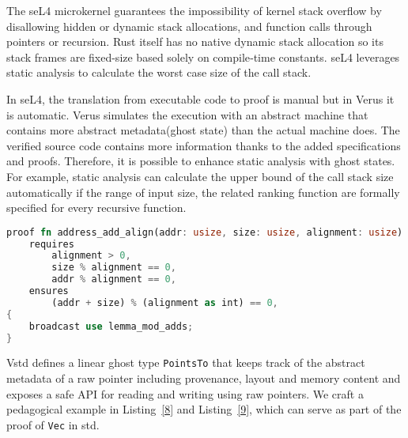 \documentclass[conference]{IEEEtran}
\begin{document}
The seL4\cite{sel4} microkernel guarantees the impossibility of kernel stack overflow by disallowing hidden or dynamic stack allocations, and function calls through pointers or recursion. Rust itself has no native dynamic stack allocation so its stack frames are fixed-size based solely on compile‐time constants. seL4 leverages static analysis to calculate the worst case size of the call stack. 

In seL4, the translation from executable code to proof is manual but in Verus it is automatic. Verus simulates the execution with an abstract machine that contains more abstract metadata(ghost state) than the actual machine does. The verified source code contains more information thanks to the added specifications and proofs. Therefore, it is possible to enhance static analysis with ghost states. For example, static analysis can calculate the upper bound of the call stack size automatically if the range of input size, the related ranking function are formally specified for every recursive function.    

\begin{lstlisting}[float,language=Rust,style=colouredRust, caption={Proving pointer addition preserves alignment with modulo arithmetics}, label = {8}]
proof fn address_add_align(addr: usize, size: usize, alignment: usize)
    requires
        alignment > 0,
        size % alignment == 0,
        addr % alignment == 0,
    ensures
        (addr + size) % (alignment as int) == 0,
{
    broadcast use lemma_mod_adds;
}
\end{lstlisting}

Vstd defines a linear ghost type \texttt{PointsTo} that keeps track of the abstract metadata of a raw pointer including provenance, layout and memory content and exposes a safe API for reading and writing using raw pointers. We craft a pedagogical example in Listing~\ref{8} and Listing~\ref{9}, which can serve as part of the proof of \texttt{Vec} in std.
\end{document}
